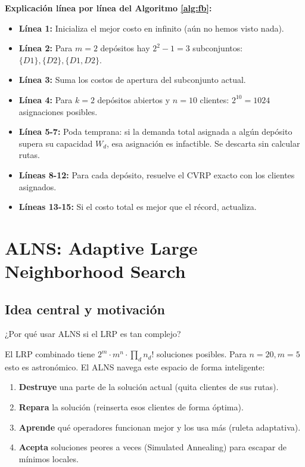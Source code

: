 \documentclass[12pt,a4paper]{article}
\begin{document}
\textbf{Explicación línea por línea del Algoritmo \ref{alg:fb}:}
\begin{itemize}
\item \textbf{Línea 1:} Inicializa el mejor costo en infinito (aún no hemos visto nada).
\item \textbf{Línea 2:} Para $m=2$ depósitos hay $2^2-1=3$ subconjuntos: $\{D1\}, \{D2\}, \{D1,D2\}$.
\item \textbf{Línea 3:} Suma los costos de apertura del subconjunto actual.
\item \textbf{Línea 4:} Para $k=2$ depósitos abiertos y $n=10$ clientes: $2^{10}=1024$ asignaciones posibles.
\item \textbf{Línea 5-7:} Poda temprana: si la demanda total asignada a algún depósito supera su capacidad $W_d$, esa asignación es infactible. Se descarta sin calcular rutas.
\item \textbf{Líneas 8-12:} Para cada depósito, resuelve el CVRP exacto con los clientes asignados.
\item \textbf{Líneas 13-15:} Si el costo total es mejor que el récord, actualiza.
\end{itemize}

\section{ALNS: Adaptive Large Neighborhood Search}

\subsection{Idea central y motivación}

\begin{pregunta}
¿Por qué usar ALNS si el LRP es tan complejo?
\end{pregunta}

El LRP combinado tiene $2^m \cdot m^n \cdot \prod_d n_d!$ soluciones posibles. Para $n=20, m=5$ esto es astronómico. El ALNS navega este espacio de forma inteligente:

\begin{enumerate}
\item \textbf{Destruye} una parte de la solución actual (quita clientes de sus rutas).
\item \textbf{Repara} la solución (reinserta esos clientes de forma óptima).
\item \textbf{Aprende} qué operadores funcionan mejor y los usa más (ruleta adaptativa).
\item \textbf{Acepta} soluciones peores a veces (Simulated Annealing) para escapar de mínimos locales.
\end{enumerate}
\end{document}
